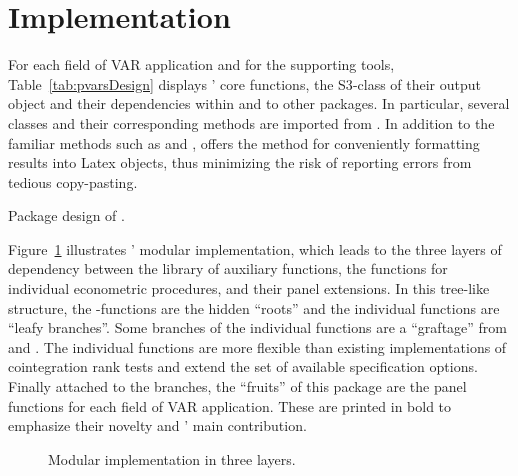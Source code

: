 
\section{Implementation} \label{sec:Implementation}
For each field of VAR application and for the supporting tools, Table~\ref{tab:pvarsDesign} displays ' core functions, the \textsf{S3}-class of their output object and their dependencies within and to other packages. In particular, several classes and their corresponding methods are imported from . In addition to the familiar methods such as  and ,  offers the method  for conveniently formatting  results into Latex objects, thus minimizing the risk of reporting errors from tedious copy-pasting. 
\begin{table}[ht]	%
	\centering
	\caption{Package design of .}
	\resizebox{\textwidth}{!}{
		}
	\label{tab:pvarsDesign}		
\end{table}

Figure~\ref{fig:Modules} illustrates ' modular implementation, which leads to the three layers of dependency between the library of auxiliary functions, the functions for individual econometric procedures, and their panel extensions. In this tree-like structure, the -functions are the hidden ``roots'' and the individual functions are ``leafy branches''. Some branches of the individual \mbox{} functions are a ``graftage'' from  and . The individual \mbox{} functions are more flexible than existing implementations of cointegration rank tests and extend the set of available specification options. Finally attached to the branches, the ``fruits'' of this package are the panel functions for each field of VAR application. These are printed in bold to emphasize their novelty and ' main contribution.
\begin{figure}[ht] %
	\centering
	\caption{Modular implementation in three layers.}
	\resizebox{0.75\textwidth}{!}{
		}
	\label{fig:Modules}
\end{figure}

